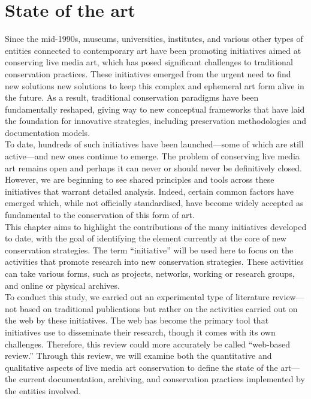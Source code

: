\chapter{\label{ch:1-state_of_the_art}State of the art}

Since the mid-1990s, museums, universities, institutes, and various other types of entities connected to contemporary art have been promoting initiatives aimed at conserving live media art, which has posed significant challenges to traditional conservation practices. These initiatives emerged from the urgent need to find new solutions new solutions to keep this complex and ephemeral art form alive in the future. As a result, traditional conservation paradigms have been fundamentally reshaped, giving way to new conceptual frameworks that have laid the foundation for innovative strategies, including preservation methodologies and documentation models.\\
To date, hundreds of such initiatives have been launched—some of which are still active—and new ones continue to emerge. The problem of conserving live media art remains open and perhaps it can never or should never be definitively closed. However, we are beginning to see shared principles and tools across these initiatives that warrant detailed analysis. Indeed, certain common factors have emerged which, while not officially standardised, have become widely accepted as fundamental to the conservation of this form of art.\\
This chapter aims to highlight the contributions of the many initiatives developed to date, with the goal of identifying the element currently at the core of new conservation strategies. The term ``initiative'' will be used here to focus on the activities that promote research into new conservation strategies. These activities can take various forms, such as projects, networks, working or research groups, and online or physical archives.\\
To conduct this study, we carried out an experimental type of literature review—not based on traditional publications but rather on the activities carried out on the web by these initiatives. The web has become the primary tool that initiatives use to disseminate their research, though it comes with its own challenges. Therefore, this review could more accurately be called ``web-based review.'' Through this review, we will examine both the quantitative and qualitative aspects of live media art conservation to define the state of the art—the current documentation, archiving, and conservation practices implemented by the entities involved.\\
